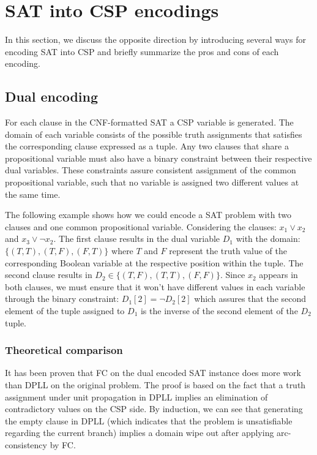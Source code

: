 \section{SAT into CSP encodings}\label{sec:sat_to_csp}
In this section, we discuss the opposite direction by introducing several ways for encoding SAT into CSP and briefly summarize the pros and cons of each encoding.

\subsection{Dual encoding}
For each clause in the CNF-formatted SAT a CSP variable is generated. The domain of each variable consists of the possible truth assignments that satisfies the corresponding clause expressed as a tuple. Any two clauses that share a propositional variable must also have a binary constraint between their respective dual variables. These constraints assure consistent assignment of the common propositional variable, such that no variable is assigned two different values at the same time. 

The following example shows how we could encode a SAT problem with two clauses and one common propositional variable. Considering the clauses: $x_1 \vee x_2$ and $x_3 \vee \neg x_2$. The first clause results in the dual variable $D_1$ with the domain: $\{(T,T),(T,F),(F,T)\}$ where $T$ and $F$ represent the truth value of the corresponding Boolean variable at the respective position within the tuple. The second clause results in $D_2 \in \{(T,F),(T,T),(F,F)\}$. Since $x_2$ appears in both clauses, we must ensure that it won't have different values in each variable through the binary constraint: $D_1[2] = \neg D_2[2]$ which assures that the second element of the tuple assigned to $D_1$ is the inverse of the second element of the $D_2$ tuple.

\subsubsection{Theoretical comparison}
It has been proven \cite{walsh2000sat} that FC on the dual encoded SAT instance does more work than DPLL on the original problem. The proof is based on the fact that a truth assignment under unit propagation in DPLL implies an elimination of contradictory values on the CSP side. By induction, we can see that generating the empty clause in DPLL (which indicates that the problem is unsatisfiable regarding the current branch) implies a domain wipe out after applying arc-consistency by FC.


